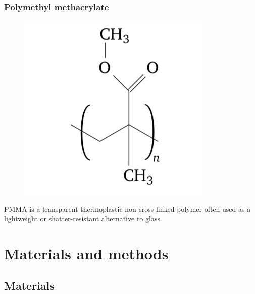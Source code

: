 \documentclass[a4paper, 11pt]{article}
\begin{document}
\subsubsection{Polymethyl methacrylate}

\begin{figure}[h!]
	\centering
	{\includegraphics[scale=0.3]{pmma_chem}}
	\captionsetup{justification=centering}
	\label{fig:PE}
\end{figure}
PMMA  is a transparent thermoplastic non-cross linked polymer often used as a lightweight or shatter-resistant alternative to glass.

\newpage 

\section{Materials and methods}

\subsection{Materials}
\end{document}
